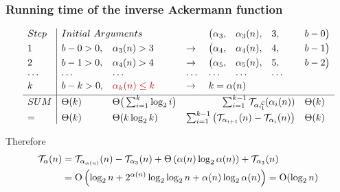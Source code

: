 \begin{frame}
\frametitle{Running time of the inverse Ackermann function}

\begin{equation*}
\begin{array}{l|llllllll}
Step & \multicolumn{2}{l}{Initial \ Arguments} &  &  \big(\alpha_3, & \alpha_3(n), & 3, & b - 0 \big) \\[3pt]
1 & b - 0 > 0, & \alpha_3(n) > 3 & \to & \big(\alpha_4, & \alpha_4(n), & 4, & b - 1\big) \\[3pt]
2 & b - 1 > 0, & \alpha_4(n) > 4 & \to  & \big(\alpha_5, & \alpha_5(n), & 5, & b - 2\big) \\
\cdots & \cdots &\cdots & \cdots & \cdots & \cdots & \cdots \\
k & b - k > 0, & {\color{red} \alpha_{k}(n) \le k} & \to  & \multicolumn{4}{l}{k = \alpha(n)} \\[3pt] \hline
SUM & \Theta(k) & \Theta\big(\sum_{i=1}^{k}\log_2i\big) & & \multicolumn{3}{r}{\sum_{i=1}^{k-1} \runtime_{\cdt{\alpha_i}{1}} (\alpha_i(n))} & \Theta(k) \\[3pt]
= & \Theta(k) & \Theta(k\log_2k) & \multicolumn{4}{r}{\sum_{i=1}^{k-1} \big(\runtime_{\alpha_{i+1}}(n) - \runtime_{\alpha_i}(n) \big)} & \Theta(k)
\end{array}
\end{equation*}

\smallskip

Therefore
\begin{equation*}
\begin{aligned}
\mathcal{T}_{\alpha}(n)
& = \mathcal{T}_{\alpha_{\alpha(n)}}(n) - \mathcal{T}_{\alpha_3}(n) + \Theta\left(\alpha(n)\log_2 \alpha(n)\right) + \mathcal{T}_{\alpha_3}(n) \\
& = \text{O} \left(\log_2n + 2^{\alpha(n)}\log_2\log_2n + \alpha(n)\log_2\alpha(n) \right) = \text{O} (\log_2n)
\end{aligned}
\end{equation*}

\end{frame}

